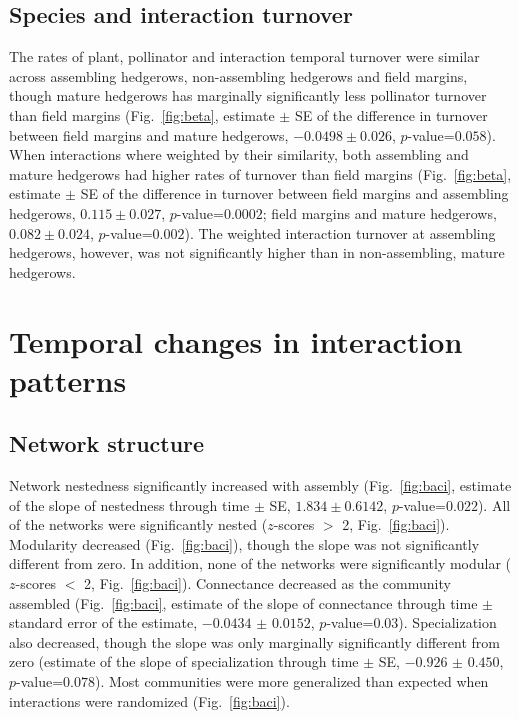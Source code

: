 \documentclass[12pt]{article}
\begin{document}
\subsection*{Species and interaction turnover}
The rates of plant, pollinator and interaction temporal turnover were
similar across assembling hedgerows, non-assembling hedgerows and
field margins, though mature hedgerows has marginally significantly
less pollinator turnover than field margins (Fig.~\ref{fig:beta},
estimate $\pm$ SE of the difference in
turnover between field margins and mature hedgerows, $-0.0498 \pm
0.026$, $p$-value=$0.058$). When interactions where weighted by their
similarity, both assembling and mature hedgerows had higher rates of
turnover than field margins (Fig.~\ref{fig:beta}, estimate $\pm$
SE of the difference in turnover between
field margins and assembling hedgerows, $0.115 \pm 0.027$,
$p$-value=$0.0002$; field margins and mature hedgerows, $0.082 \pm
0.024$, $p$-value=$0.002$). The weighted interaction turnover at
assembling hedgerows, however, was not significantly higher than in
non-assembling, mature hedgerows.

\section*{Temporal changes in interaction patterns}
\subsection*{Network structure}
Network nestedness significantly increased with assembly
(Fig.~\ref{fig:baci}, estimate of the slope of nestedness through time
$\pm$ SE, $1.834 \pm 0.6142$, $p$-value=$0.022$). All of the networks
were significantly nested ($z$-scores $>$ 2,
Fig.~\ref{fig:baci}). Modularity decreased (Fig.~\ref{fig:baci}),
though the slope was not significantly different from
zero. %
In addition, none of the networks were significantly modular
($z$-scores $<$ 2, Fig.~\ref{fig:baci}). Connectance decreased as the
community assembled (Fig.~\ref{fig:baci}, estimate of the slope of
connectance through time $\pm$ standard error of the estimate,
$-0.0434$ $\pm$ $0.0152$, $p$-value=$0.03$). Specialization also
decreased, though the slope was only marginally significantly
different from zero (estimate of the slope of specialization through
time $\pm$ SE, $-0.926$ $\pm$ $0.450$, $p$-value=$0.078$). Most
communities were more generalized than expected when interactions were
randomized (Fig.~\ref{fig:baci}).
\end{document}
